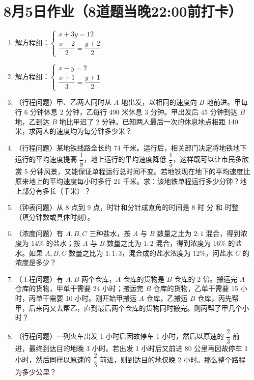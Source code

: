 \documentclass[UTF8,12pt,a4paper]{ctexart}
\newcommand{\BottomWriteSpace}{0.5cm}
\newenvironment{OnePageEightFill}{
  \small
  \vspace*{0pt}
  \begin{enumerate}[leftmargin=*, itemsep=0pt, topsep=0pt, parsep=0pt, partopsep=0pt]
  \setlength{\parskip}{0pt}
}{
  \end{enumerate}
  \vspace*{\BottomWriteSpace}
  \normalsize
  \newpage
}
\newcommand{\Q}[1]{\item #1\par\vfill}
\newcommand{\Qlast}[1]{\item #1\par}
\begin{document}
\section*{8月5日作业（8道题当晚22:00前打卡）}
\begin{OnePageEightFill}

\Q{解方程组：$\begin{cases} x + 3y = 12 \\ \dfrac{x-2}{2} = \dfrac{y+2}{2} \end{cases}$}

\Q{解方程组：$\begin{cases} x - y = 2 \\ \dfrac{x+1}{3} = \dfrac{y+1}{2} \end{cases}$}

\Q{（行程问题）甲、乙两人同时从 $A$ 地出发，以相同的速度向 $B$ 地前进。甲每行 6 分钟休息 2 分钟，乙每行 490 米休息 3 分钟。甲出发后 45 分钟到达 $B$ 地，乙到达 $B$ 地比甲迟了 2 分钟。已知两人最后一次的休息地点相距 140 米，求两人的速度均为每分钟多少米？}

\Q{（行程问题）某地铁线路全长约 74 千米。运行后，相关部门决定将地铁地下运行的平均速度提高 $\dfrac{1}{8}$，地上运行的平均速度降低 $\dfrac{1}{5}$，这样既可以让市民多欣赏 5 分钟风景，又能保证单程运行总时间不变。若地铁现在地下的平均速度比原来地上的平均速度每小时多行 21 千米。求：该地铁单程运行多少分钟？地上部分有多长（千米）？}

\Q{（钟表问题）从 8 点到 9 点，时针和分针成直角的时间是 8 时 \underline{\hspace{3em}} 分 和 \underline{\hspace{3em}} 时整（填分钟数或具体时刻）。}

\Q{（浓度问题）有 $A, B, C$ 三种盐水，按 $A$ 与 $B$ 数量之比为 $2:1$ 混合，得到浓度为 $14\%$ 的盐水；按 $A$ 与 $B$ 数量之比为 $1:2$ 混合，得到浓度为 $16\%$ 的盐水。如果 $A, B, C$ 数量之比为 $1:1:3$，混合成的盐水浓度为 $12\%$，问盐水 $C$ 的浓度是多少？}

\Q{（工程问题）有 $A, B$ 两个仓库，$A$ 仓库的货物是 $B$ 仓库的 2 倍。搬运完 $A$ 仓库的货物，甲单干需要 24 小时；搬运完 $B$ 仓库的货物，乙单干需要 15 小时，丙单干需要 10 小时。刚开始甲搬运 $A$ 仓库，乙搬运 $B$ 仓库，丙先帮甲，后来丙又去帮乙，直到最后两个仓库的货物同时搬完。则丙帮了甲几个小时？}

\Qlast{（行程问题）一列火车出发 1 小时后因故停车 1 小时，然后以原速的 $\dfrac{2}{3}$ 前进，最终到达目的地晚 3 小时。若出发 1 小时后又前进 80 公里再因故停车 1 小时，然后同样以原速的 $\dfrac{2}{3}$ 前进，则到达目的地仅晚 2 小时。那么整个路程为多少公里？}

\end{OnePageEightFill}
\end{document}
